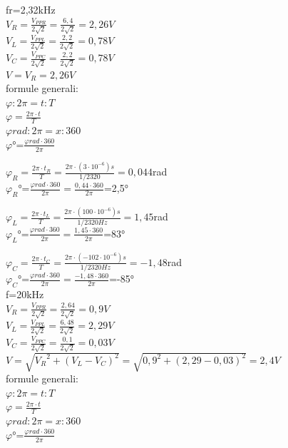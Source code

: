 \documentclass[12pt]{article}
\begin{document}
\begin{center}
\vspace{10mm}
fr=2,32kHz\\
\vspace{5mm}
$V_R=\frac{V_{PPR}}{2\sqrt{2}}=\frac{6,4}{2\sqrt{2}}=2,26V$\\
$V_L=\frac{V_{PPL}}{2\sqrt{2}}=\frac{2,2}{2\sqrt{2}}=0,78V$\\
$V_C=\frac{V_{PPC}}{2\sqrt{2}}=\frac{2,2}{2\sqrt{2}}=0,78V$\\
$V=V_R=2,26V$\\
\vspace{5mm}
formule generali:\\
${\varphi}:2\pi=t:T$ \\
${\varphi}=\frac{2\pi \cdot t}{T}$\\
${\varphi}rad:2\pi=x:360$\\
$\varphi$°=$\frac{\varphi rad \cdot 360}{2\pi}$\\
\vspace{10mm}

${\varphi}_R=\frac{2\pi \cdot t_R}{T}=\frac{2\pi \cdot (3 \cdot 10^{-6})s}{1/2320}=0,044$rad\\
${\varphi}_R$°=$\frac{\varphi rad \cdot 360}{2\pi}=\frac{0,44 \cdot 360}{2\pi}$=2,5°\\
\vspace{5mm}

${\varphi}_L=\frac{2\pi \cdot t_L}{T}=\frac{2\pi \cdot (100 \cdot 10^{-6})s}{1/2320Hz}=1,45$rad\\
${\varphi}_L$°=$\frac{\varphi rad \cdot 360}{2\pi}=\frac{1,45 \cdot 360}{2\pi}$=83°\\
\vspace{5mm}

${\varphi}_C=\frac{2\pi \cdot t_C}{T}=\frac{2\pi \cdot (-102 \cdot 10^{-6})s}{1/2320Hz}=-1,48$rad\\
${\varphi}_C$°=$\frac{\varphi rad \cdot 360}{2\pi}=\frac{-1,48 \cdot 360}{2\pi}$=-85°\\

\vspace{10mm}
f=20kHz\\
\vspace{5mm}
$V_R=\frac{V_{PPR}}{2\sqrt{2}}=\frac{2,64}{2\sqrt{2}}=0,9V$\\
$V_L=\frac{V_{PPL}}{2\sqrt{2}}=\frac{6,48}{2\sqrt{2}}=2,29V$\\
$V_C=\frac{V_{PPC}}{2\sqrt{2}}=\frac{0,1}{2\sqrt{2}}=0,03V$\\
$V=\sqrt{{V_R}^2+(V_L-V_C)^2}=\sqrt{{0,9}^2+(2,29-0,03)^2}=2,4V$\\
\vspace{5mm}
formule generali:\\
${\varphi}:2\pi=t:T$ \\
${\varphi}=\frac{2\pi \cdot t}{T}$\\
${\varphi}rad:2\pi=x:360$\\
$\varphi$°=$\frac{\varphi rad \cdot 360}{2\pi}$\\
\vspace{10mm}


\end{center}
\end{document}
